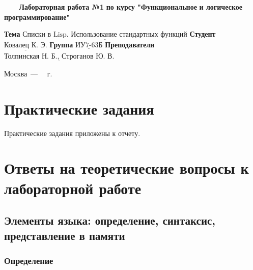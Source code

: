 \documentclass[a4paper,14pt, unknownkeysallowed]{extreport}
\begin{document}
\begin{titlepage}
	
	\begin{center}
		\noindent\begin{minipage}{1.3\textwidth}\centering
		\Large\textbf{   ~~~ Лабораторная работа №1}\newline
		\textbf{по курсу "Функциональное}\newline
		\textbf{и логическое программирование"}\newline\newline\newline
		\end{minipage}
	\end{center}
	
	\noindent\textbf{Тема} 			$\underline{\text{Списки в Lisp. Использование стандартных функций}}$\newline\newline
	\noindent\textbf{Студент} 		$\underline{\text{Ковалец К. Э.}}$\newline\newline
	\noindent\textbf{Группа} 		$\underline{\text{ИУ7-63Б}}$\newline\newline
	\noindent\textbf{Преподаватели} $\underline{\text{Толпинская Н. Б., Строганов Ю. В.}}$\newline
	
	\begin{center}
		\vfill
		Москва~---~\the\year
		~г.
	\end{center}
	\restoregeometry
\end{titlepage}



\setcounter{page}{2}
\chapter{Практические задания}

Практические задания приложены к отчету.

\chapter{Ответы на теоретические вопросы к лабораторной работе}

\section{Элементы языка: определение, синтаксис, представление в памяти}

\subsection{Определение}
\end{document}
